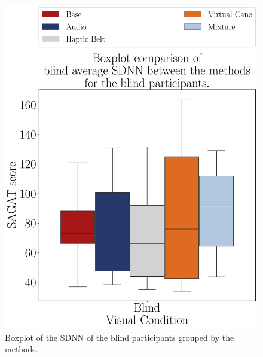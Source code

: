 \begin{figure}[!htb]
    \centering
    \begin{minipage}{0.45\textwidth}
        \centering
        \includegraphics[width = \textwidth]{Resultados/ECG/Figuras/pdf/boxplot_ecg_sdnn_blind_scene.pdf}
        \caption{Boxplot of the SDNN of the blind participants grouped by the methods.}
        \label{fig:boxplot_ecg_sdnn_blind_scene}
    \end{minipage}
    \begin{minipage}{0.075\textwidth}
        \hfill
    \end{minipage}
    \begin{minipage}{0.45\textwidth}
        \centering

\end{minipage}
\end{figure}
